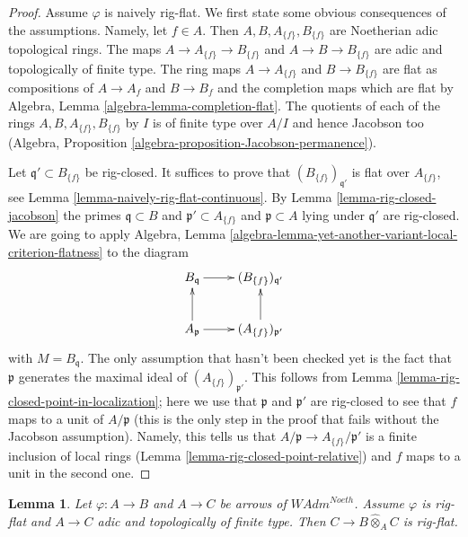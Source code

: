 \documentclass{stacks-project}
\theoremstyle{plain}
\newtheorem{lemma}[subsection]{Lemma}
\theoremstyle{definition}
\theoremstyle{remark}
\numberwithin{equation}{subsection}
\begin{document}
\begin{proof}
Assume $\varphi$ is naively rig-flat. We first state some obvious
consequences of the assumptions. Namely, let $f \in A$.
Then $A, B, A_{\{f\}}, B_{\{f\}}$
are Noetherian adic topological rings. The maps
$A \to A_{\{f\}} \to B_{\{f\}}$ and $A \to B \to B_{\{f\}}$
are adic and topologically of finite type.
The ring maps $A \to A_{\{f\}}$ and $B \to B_{\{f\}}$
are flat as compositions of $A \to A_f$ and $B \to B_f$
and the completion maps which are flat by
Algebra, Lemma \ref{algebra-lemma-completion-flat}.
The quotients of each of the rings
$A, B, A_{\{f\}}, B_{\{f\}}$ by $I$ is of finite type
over $A/I$ and hence Jacobson too
(Algebra, Proposition \ref{algebra-proposition-Jacobson-permanence}).

\medskip\noindent
Let $\mathfrak q' \subset B_{\{f\}}$ be rig-closed.
It suffices to prove that $(B_{\{f\}})_{\mathfrak q'}$
is flat over $A_{\{f\}}$, see Lemma \ref{lemma-naively-rig-flat-continuous}.
By Lemma \ref{lemma-rig-closed-jacobson} the primes
$\mathfrak q \subset B$ and $\mathfrak p' \subset A_{\{f\}}$
and $\mathfrak p \subset A$ lying under $\mathfrak q'$ are rig-closed.
We are going to apply
Algebra, Lemma \ref{algebra-lemma-yet-another-variant-local-criterion-flatness}
to the diagram
$$
\xymatrix{
B_\mathfrak q \ar[r] &
(B_{\{f\}})_{\mathfrak q'} \\
A_\mathfrak p \ar[u] \ar[r] &
(A_{\{f\}})_{\mathfrak p'} \ar[u]
}
$$
with $M = B_\mathfrak q$.
The only assumption that hasn't been checked yet is the fact
that $\mathfrak p$ generates the maximal ideal of
$(A_{\{f\}})_{\mathfrak p'}$. This follows from
Lemma \ref{lemma-rig-closed-point-in-localization};
here we use that $\mathfrak p$ and $\mathfrak p'$ are rig-closed
to see that $f$ maps to a unit of $A/\mathfrak p$
(this is the only step in the proof that fails without
the Jacobson assumption). Namely,
this tells us that $A/\mathfrak p \to A_{\{f\}}/\mathfrak p'$
is a finite inclusion of local rings
(Lemma \ref{lemma-rig-closed-point-relative})
and $f$ maps to a unit in the second one.
\end{proof}

\begin{lemma}
\label{lemma-rig-flat-base-change}
Let $\varphi : A \to B$ and $A \to C$ be arrows of $\textit{WAdm}^{Noeth}$.
Assume $\varphi$ is rig-flat and $A \to C$ adic and topologically
of finite type. Then $C \to B \widehat{\otimes}_A C$ is rig-flat.
\end{lemma}
\end{document}
